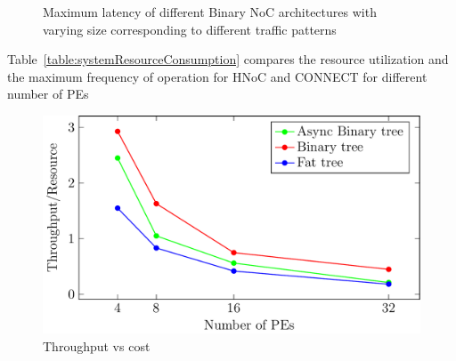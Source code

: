 \begin{figure}[!h]
{}
\caption{Maximum latency of different Binary NoC architectures with varying size corresponding to different traffic patterns}
\end{figure}

Table~\ref{table:systemResourceConsumption} compares the resource utilization and the maximum frequency of operation for HNoC and CONNECT for different number of PEs


\begin{figure}[t]
\centering
   \includegraphics[width=\columnwidth]{Data/tputVsCost.pdf}
   \caption{Throughput vs cost}
\end{figure}
